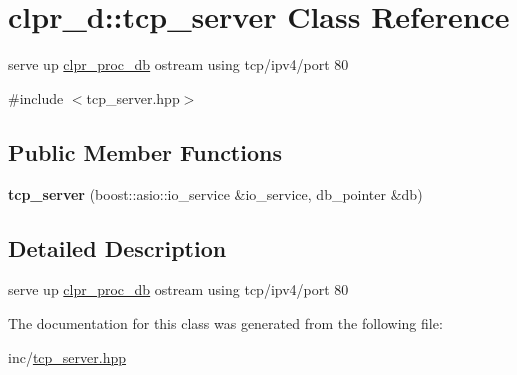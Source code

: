\hypertarget{classclpr__d_1_1tcp__server}{\section{clpr\-\_\-d\-:\-:tcp\-\_\-server \-Class \-Reference}
\label{classclpr__d_1_1tcp__server}
}


serve up \hyperlink{classclpr__d_1_1clpr__proc__db}{clpr\-\_\-proc\-\_\-db} ostream using tcp/ipv4/port 80  




{\ttfamily \#include $<$tcp\-\_\-server.\-hpp$>$}

\subsection*{\-Public \-Member \-Functions}
\begin{DoxyCompactItemize}
\item 
\hypertarget{classclpr__d_1_1tcp__server_a01b3f831aa702131bf561a5264ace5a6}{{\bfseries tcp\-\_\-server} (boost\-::asio\-::io\-\_\-service \&io\-\_\-service, db\-\_\-pointer \&db)}\label{classclpr__d_1_1tcp__server_a01b3f831aa702131bf561a5264ace5a6}

\end{DoxyCompactItemize}


\subsection{\-Detailed \-Description}
serve up \hyperlink{classclpr__d_1_1clpr__proc__db}{clpr\-\_\-proc\-\_\-db} ostream using tcp/ipv4/port 80 

\-The documentation for this class was generated from the following file\-:\begin{DoxyCompactItemize}
\item 
inc/\hyperlink{tcp__server_8hpp}{tcp\-\_\-server.\-hpp}\end{DoxyCompactItemize}
